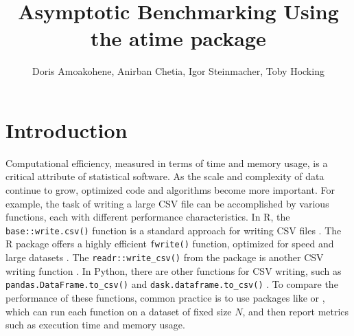 \title{Asymptotic Benchmarking Using the atime package}
\author{Doris Amoakohene, Anirban Chetia, Igor Steinmacher, Toby Hocking}

\maketitle


\section{Introduction}

Computational efficiency, measured in terms of time and memory usage, is a critical attribute of statistical software. As the scale and complexity of data continue to grow, optimized code and algorithms become more important.
For example, the task of writing a large CSV file can be accomplished by various functions, each with different performance characteristics. 
In R, the \texttt{base::write.csv()} function is a standard approach for writing CSV files \citep{baseR}.
The R package  offers a highly efficient \texttt{fwrite()} function, optimized for speed and large datasets \citep{data.table}. 
The \texttt{readr::write\_csv()} from the  package is another CSV writing function \citep{readr}.
In Python, there are other functions for CSV writing, such as \texttt{pandas.DataFrame.to\_csv()} and \texttt{dask.dataframe.to\_csv()}  \citep{pandas, dask}.
To compare the performance of these functions, common practice is to use packages like  \citep{microbenchmark} or  \citep{bench}, which can run each function on a dataset of fixed size $N$, and then report metrics such as execution time and memory usage.

